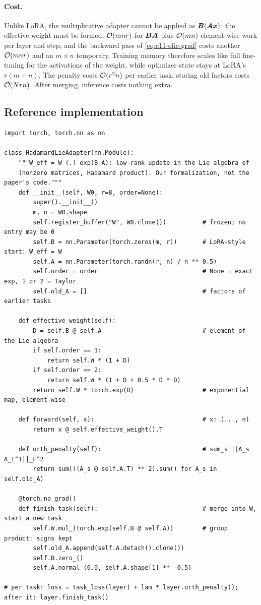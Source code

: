 \paragraph{Cost.} Unlike LoRA, the multiplicative adapter cannot be applied as $\bm{B}(\bm{A}\bm{x})$:
the effective weight must be formed, $\mathcal{O}(mnr)$ for $\bm{B}\bm{A}$ plus $\mathcal{O}(mn)$ element-wise work
per layer and step, and the backward pass of \cref{eq:c11-olie-grad} costs another $\mathcal{O}(mnr)$
and an $m\times n$ temporary. Training memory therefore scales like full fine-tuning for the
activations of the weight, while optimizer state stays at LoRA's $r(m+n)$. The penalty costs
$\mathcal{O}(r^2n)$ per earlier task; storing old factors costs $\mathcal{O}(Nrn)$. After merging, inference
costs nothing extra.

\subsection{Reference implementation}\label{sec:c11-ol-ref}

\begin{lstlisting}[caption={Reference implementation (ours): a multiplicative low-rank adapter in the Hadamard Lie group with an O-LoRA-style orthogonality penalty},label={lst:c11-olie-ref}]
import torch, torch.nn as nn

class HadamardLieAdapter(nn.Module):
    """W_eff = W (.) exp(B A): low-rank update in the Lie algebra of
    (nonzero matrices, Hadamard product). Our formalization, not the paper's code."""
    def __init__(self, W0, r=8, order=None):
        super().__init__()
        m, n = W0.shape
        self.register_buffer("W", W0.clone())          # frozen; no entry may be 0
        self.B = nn.Parameter(torch.zeros(m, r))       # LoRA-style start: W_eff = W
        self.A = nn.Parameter(torch.randn(r, n) / n ** 0.5)
        self.order = order                             # None = exact exp, 1 or 2 = Taylor
        self.old_A = []                                # factors of earlier tasks

    def effective_weight(self):
        D = self.B @ self.A                            # element of the Lie algebra
        if self.order == 1:
            return self.W * (1 + D)
        if self.order == 2:
            return self.W * (1 + D + 0.5 * D * D)
        return self.W * torch.exp(D)                   # exponential map, element-wise

    def forward(self, x):                              # x: (..., n)
        return x @ self.effective_weight().T

    def orth_penalty(self):                            # sum_s ||A_s A_t^T||_F^2
        return sum(((A_s @ self.A.T) ** 2).sum() for A_s in self.old_A)

    @torch.no_grad()
    def finish_task(self):                             # merge into W, start a new task
        self.W.mul_(torch.exp(self.B @ self.A))        # group product: signs kept
        self.old_A.append(self.A.detach().clone())
        self.B.zero_()
        self.A.normal_(0.0, self.A.shape[1] ** -0.5)

# per task: loss = task_loss(layer) + lam * layer.orth_penalty(); after it: layer.finish_task()
\end{lstlisting}

